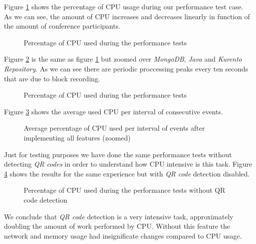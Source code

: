 Figure \ref{fig:test_full_features_cpu} shows the percentage of \ac{CPU} usage during our performance test case. As we can see, the amount of \ac{CPU} increases and decreases linearly in function of the amount of conference participants. 

\begin{figure}[!htb]
  \begin{center}
    
  \end{center}
  \caption{Percentage of CPU used during the performance tests}
  \label{fig:test_full_features_cpu}
\end{figure}

Figure \ref{fig:test_full_features_cpu_zoom} is the same as figure \ref{fig:test_full_features_cpu} but zoomed over \emph{MongoDB}, \emph{Java} and \emph{Kurento Repository}. As we can see there are periodic proccessing peaks every ten seconds that are due to block recording. 

\begin{figure}[!htb]
  \begin{center}
    
  \end{center}
  \caption{Percentage of CPU used during the performance tests}
  \label{fig:test_full_features_cpu_zoom}
\end{figure}

   Figure \ref{fig:summary_full_cpu} shows the average used \ac{CPU} per interval of consecutive events. 

\begin{figure}[!htb]
  \begin{center}
    
  \end{center}
  \caption{Average percentage of CPU used per interval of events after implementing all features (zoomed)}
  \label{fig:summary_full_cpu}
\end{figure}

  Just for testing purposes we have done the same performance tests without detecting \emph{QR codes} in order to understand how \ac{CPU} intensive is this task. Figure \ref{fig:test_without_qrcode_cpu} shows the results for the same experience but with \emph{QR code} detection disabled.

  \begin{figure}[!htb]
  \begin{center}
    
  \end{center}
  \caption{Percentage of CPU used during the performance tests without QR code detection}
  \label{fig:test_without_qrcode_cpu}
\end{figure}

We conclude that \emph{QR code} detection is a very intensive task, approximately doubling the amount of work performed by \ac{CPU}. Without this feature the network and memory usage had insignificate changes compared to \ac{CPU} usage.